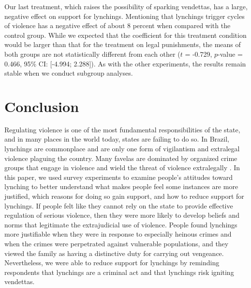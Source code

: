 \documentclass[12pt,ansiapaper]{article}
\begin{document}
Our last treatment, which raises the possibility of sparking vendettas, has a large, negative effect on support for lynchings. Mentioning that lynchings trigger cycles of violence has a negative effect of about 8 percent when compared with the control group. While we expected that the coefficient for this treatment condition would be larger than that for the treatment on legal punishments, the means of both groups are not statistically different from each other ($t$ = -0.729, $p$-value = 0.466, 95\% CI: [-4.994; 2.288]). As with the other experiments, the results remain stable when we conduct subgroup analyses. 

\section{Conclusion}
\label{conclusion}

Regulating violence is one of the most fundamental responsibilities of the state, and in many places in the world today, states are failing to do so. In Brazil, lynchings are commonplace and are only one form of vigilantism and extralegal violence plaguing the country. Many favelas are dominated by organized crime groups that engage in violence and wield the threat of violence extralegally \citep{arias2006dynamics,barnes2021logic}. In this paper, we used survey experiments to examine people's attitudes toward lynching to better understand what makes people feel some instances are more justified, which reasons for doing so gain support, and how to reduce support for lynchings. If people felt like they cannot rely on the state to provide effective regulation of serious violence, then they were more likely to develop beliefs and norms that legitimate the extrajudicial use of violence. People found lynchings more justifiable when they were in response to especially heinous crimes and when the crimes were perpetrated against vulnerable populations, and they viewed the family as having a distinctive duty for carrying out vengeance. Nevertheless, we were able to reduce support for lynchings by reminding respondents that lynchings are a criminal act and that lynchings risk igniting vendettas. 
\end{document}
